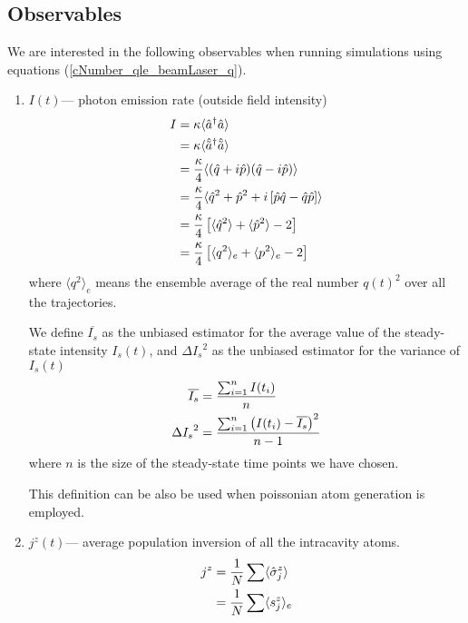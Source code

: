 \documentclass{article}
\begin{document}
\subsection{Observables}
We are interested in the following observables when running simulations using equations (\ref{cNumber_qle_beamLaser_q}).
\begin{enumerate}
    \item  $I(t)$\---- photon emission rate (outside field intensity)
        \begin{align}
        \label{intensity_cNumberCavity}
            \notag I &= \kappa \langle \hat{a}^\dagger \hat{a} \rangle\\
            \notag   &= \kappa \langle \hat{\tilde{a}}^\dagger \hat{\Tilde{a}} \rangle\\
            \notag   &= \frac{\kappa}{4} \langle ( \hat{q}+i\hat{p})(\hat{q}-i\hat{p}) \rangle\\
            \notag   &= \frac{\kappa}{4} \langle \hat{q}^2+\hat{p}^2+i\left[\hat{p}\hat{q}-\hat{q}\hat{p}\right] \rangle\\
            \notag   &= \frac{\kappa}{4}\left[\langle \hat{q}^2\rangle+\langle\hat{p}^2\rangle-2\right]\\
                     &= \frac{\kappa}{4}\left[\langle q^2 \rangle_e+\langle p^2 \rangle_e-2\right]
        \end{align}
        where $\langle q^2 \rangle_e$ means the ensemble average of the real number $q(t)^2$ over all the trajectories.
    
    We define $\overline{I_s}$ as the unbiased estimator for the average value of the steady-state intensity $I_s(t)$, and ${\Delta I_s}^2$ as the unbiased estimator for the variance of $I_s(t)$
    \begin{align}
    \label{estimator;intensity}
        \notag \overline{I_s} &= \frac{\sum_{i=1}^{n} I(t_i)}{n}\\
               {\Delta I_s}^2 &= \frac{\sum_{i=1}^{n} \left(I(t_i)-\overline{I_s}\right)^2}{n-1}
    \end{align}
    where $n$ is the size of the steady-state time points we have chosen.
    
    This definition can be also be used when poissonian atom generation is employed.
    \item $j^z(t)$\---- average population inversion of all the intracavity atoms.
        \begin{align}
            \notag j^z &= \frac{1}{N}\sum \langle \hat{\sigma}^z _j\rangle\\
                       &= \frac{1}{N}\sum \langle s_j^z\rangle_e
        \end{align}
        

\end{enumerate}
\end{document}
